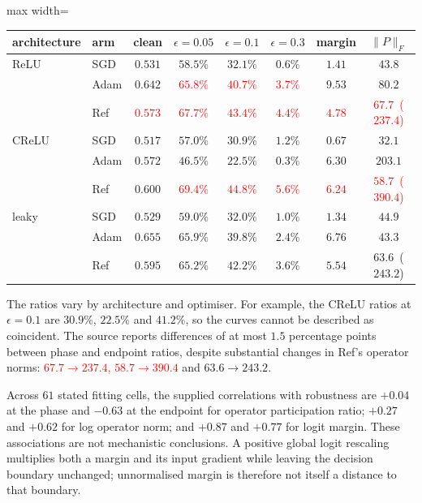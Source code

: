 \documentclass{article}
\newcommand{\nat}[1]{\textcolor{red}{#1}}
\theoremstyle{definition}
\theoremstyle{remark}
\begin{document}
\begin{center}\small
\begin{adjustbox}{max width=\linewidth}
\begin{tabular}{llcccccc}
\toprule
architecture & arm & clean & $\epsilon{=}0.05$ & $\epsilon{=}0.1$ & $\epsilon{=}0.3$ & margin & $\|P\|_F$ \\
\midrule
ReLU  & SGD & $0.531$ & $58.5\%$ & $32.1\%$ & $0.6\%$ & $1.41$ & $43.8$ \\
      & Adam             & $0.642$ & \nat{$65.8\%$} & \nat{$40.7\%$} & \nat{$3.7\%$} & $9.53$ & $80.2$ \\
      & Ref        & \nat{$0.573$} & \nat{$\mathbf{67.7\%}$} & \nat{$\mathbf{43.4\%}$} & \nat{$\mathbf{4.4\%}$} & \nat{$4.78$} & \nat{$67.7$ \,($237.4$)} \\
\midrule
CReLU & SGD & $0.517$ & $57.0\%$ & $30.9\%$ & $1.2\%$ & $0.67$ & $32.1$ \\
      & Adam             & $0.572$ & $46.5\%$ & $22.5\%$ & $0.3\%$ & $6.30$ & $203.1$ \\
      & Ref        & $0.600$ & \nat{$\mathbf{69.4\%}$} & \nat{$\mathbf{44.8\%}$} & \nat{$\mathbf{5.6\%}$} & \nat{$6.24$} & \nat{$58.7$ \,($390.4$)} \\
\midrule
leaky & SGD & $0.529$ & $59.0\%$ & $32.0\%$ & $1.0\%$ & $1.34$ & $44.9$ \\
      & Adam             & $0.655$ & $\mathbf{65.9\%}$ & $39.8\%$ & $2.4\%$ & $6.76$ & $43.3$ \\
      & Ref        & $0.595$ & $65.2\%$ & $\mathbf{42.2\%}$ & $\mathbf{3.6\%}$ & $5.54$ & $63.6$ \,($243.2$) \\
\bottomrule
\end{tabular}
\end{adjustbox}
\end{center}

The ratios vary by architecture and optimiser. For example, the CReLU ratios at $\epsilon=0.1$ are $30.9\%$, $22.5\%$ and $41.2\%$, so the curves cannot be described as coincident. The source reports differences of at most $1.5$ percentage points between phase and endpoint ratios, despite substantial changes in Ref's operator norms: \nat{$67.7\to237.4$, $58.7\to390.4$} and $63.6\to243.2$.

Across $61$ stated fitting cells, the supplied correlations with robustness are $+0.04$ at the phase and $-0.63$ at the endpoint for operator participation ratio; $+0.27$ and $+0.62$ for log operator norm; and $+0.87$ and $+0.77$ for logit margin. These associations are not mechanistic conclusions. A positive global logit rescaling multiplies both a margin and its input gradient while leaving the decision boundary unchanged; unnormalised margin is therefore not itself a distance to that boundary.
\end{document}
